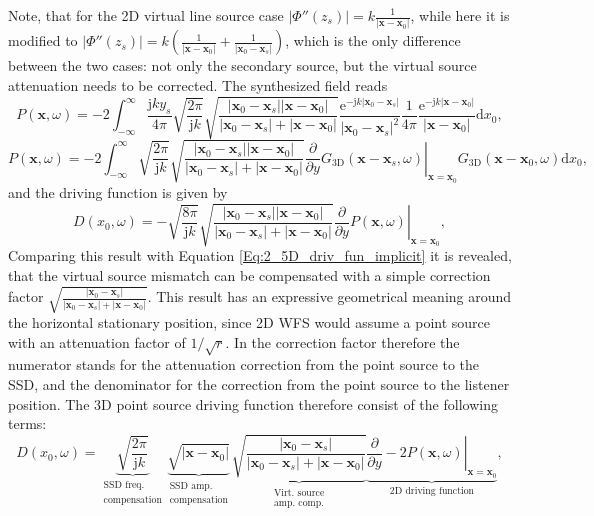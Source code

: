 \documentclass[12pt,a4paper]{article}
\newcommand{\td}{\mathrm{d}}
\newcommand{\te}{\mathrm{e}}
\newcommand{\ti}{\mathrm{j}}
\newcommand{\vx}{\mathbf{x}}
\newcommand{\vxo}{\mathbf{x}_0}
\begin{document}
Note, that for the 2D virtual line source case $|\Phi''(z_s)| = k \frac{1}{ |\vx - \vxo| }$, while here it is modified to $|\Phi''(z_s)| = k \left( \frac{1}{| \vx - \vxo|} + \frac{1}{ |\vxo - \mathbf{x}_s |} \right)$, which is the only difference between the two cases: not only the secondary source, but the virtual source attenuation needs to be corrected.
The synthesized field reads
\begin{equation}
P(\vx,\omega) = -2 \int_{-\infty}^{\infty} \frac{\ti k y_s}{4\pi} \sqrt{\frac{2\pi}{\ti k}}\sqrt{\frac{| \vxo - \mathbf{x}_s | | \vx - \vxo|  }{| \vxo - \mathbf{x}_s | + | \vx - \vxo| }} \frac{\te^{-\ti k | \vxo - \mathbf{x}_s | }}{|\vxo - \mathbf{x}_s|^2} \frac{1}{4\pi} \frac{\te^{-\ti k | \vx - \vxo| }}{ | \vx - \vxo| } \td x_0,
\end{equation}	
\begin{equation}
P(\vx,\omega) = -2 \int_{-\infty}^{\infty}  \sqrt{\frac{2\pi}{\ti k}}\sqrt{\frac{| \vxo - \mathbf{x}_s | | \vx - \vxo|  }{| \vxo - \mathbf{x}_s | + | \vx - \vxo| }} \left. \frac{\partial}{\partial y} G_{3\mathrm{D}}(\vx - \mathbf{x}_s,\omega) \right|_{\vx = \vxo}   G_{3\mathrm{D}}(\vx - \vxo,\omega) \td x_0,
\end{equation}
and the driving function is given by
\begin{equation}
D(x_0,\omega) = 
- \sqrt{\frac{8\pi}{\ti k}} \sqrt{\frac{| \vxo - \mathbf{x}_s | | \vx - \vxo|  }{| \vxo - \mathbf{x}_s | + | \vx - \vxo| }} \left. \frac{\partial}{\partial y} P(\vx,\omega) \right|_{\vx = \vxo},
\label{Eq:2_5D_point_source_implicit_df}
\end{equation}
Comparing this result with Equation \eqref{Eq:2_5D_driv_fun_implicit} it is revealed, that the virtual source mismatch can be compensated with a simple correction factor $\sqrt{\frac{| \vxo - \mathbf{x}_s |  }{| \vxo - \mathbf{x}_s | + | \vx - \vxo| }}$. This result has an expressive geometrical meaning around the horizontal stationary position, since 2D WFS would assume a point source with an attenuation factor of $1/\sqrt{r}$. In the correction factor therefore the numerator stands for the attenuation correction from the point source to the SSD, and the denominator for the correction from the point source to the listener position. %
The 3D point source driving function therefore consist of the following terms:
\begin{equation}
D(x_0,\omega) = 
\underbrace{\sqrt{\frac{2\pi}{\ti k}}}_{\substack{\text{SSD freq.}\\\text{compensation}}} 
\underbrace{\sqrt{ | \vx - \vxo|}}_{\substack{\text{SSD amp.}\\\text{compensation}}} 
\underbrace{\sqrt{\frac{| \vxo - \mathbf{x}_s |  }{| \vxo - \mathbf{x}_s | + | \vx - \vxo| }}  }_
{\substack{\text{Virt. source}\\\text{amp. comp.}}}
\underbrace{ \left. \frac{\partial}{\partial y} -2 P(\vx,\omega) \right|_{\vx = \vxo}}_{\text{2D driving function}},
\end{equation}
\end{document}
